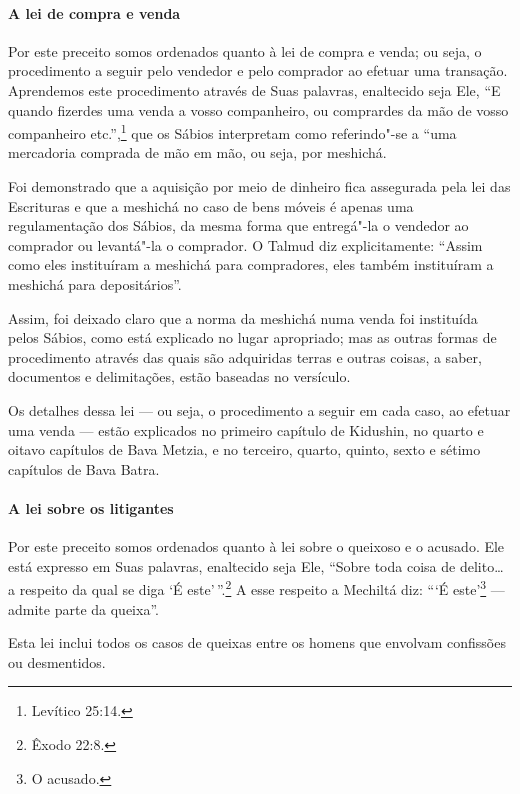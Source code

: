 \begin{multicols}{2}
\paragraph{A lei de compra e venda}

Por este preceito somos ordenados quanto à lei de compra e venda; ou
seja, o procedimento a seguir pelo vendedor e pelo comprador ao efetuar
uma transação. Aprendemos este procedimento através de Suas palavras,
enaltecido seja Ele, ``E quando fizerdes uma venda a vosso companheiro,
ou comprardes da mão de vosso companheiro etc.'',\footnote{Levítico 25:14.} que
os Sábios interpretam como referindo"-se a ``uma mercadoria comprada de mão em mão,
ou seja, por meshichá\starr.

Foi demonstrado que a aquisição por meio de dinheiro fica assegurada
pela lei das Escrituras e que a meshichá\starr{} no caso de bens móveis é
apenas uma regulamentação dos Sábios, da mesma forma que entregá"-la o
vendedor ao comprador ou levantá"-la o comprador. O Talmud\starr{} diz
explicitamente: ``Assim como eles instituíram a meshichá\starr{} para
compradores, eles também instituíram a meshichá\starr{} para depositários''.

Assim, foi deixado claro que a norma da meshichá\starr{} numa venda foi
instituída pelos Sábios, como está explicado no lugar apropriado; mas as
outras formas de procedimento através das quais são adquiridas terras e
outras coisas, a saber, documentos e delimitações, estão baseadas no
versículo.

Os detalhes dessa lei --- ou seja, o procedimento a seguir em cada caso,
ao efetuar uma venda --- estão explicados no primeiro capítulo de
Kidushin\starr, no quarto e oitavo capítulos de Bava Metzia\starr, e no terceiro,
quarto, quinto, sexto e sétimo capítulos de Bava Batra\starr.

\paragraph{A lei sobre os litigantes}

Por este preceito somos ordenados quanto à lei sobre o queixoso
e o acusado. Ele está expresso em Suas palavras, enaltecido seja Ele,
``Sobre toda coisa de delito\ldots{} a respeito da qual se diga `É este'\,''.\footnote{Êxodo 22:8.} A esse respeito a Mechiltá\starr{} diz: ```É
este'\footnote{O acusado.} --- admite parte da queixa''.

Esta lei inclui todos os casos de queixas entre os homens que envolvam
confissões ou desmentidos.


\end{multicols}

